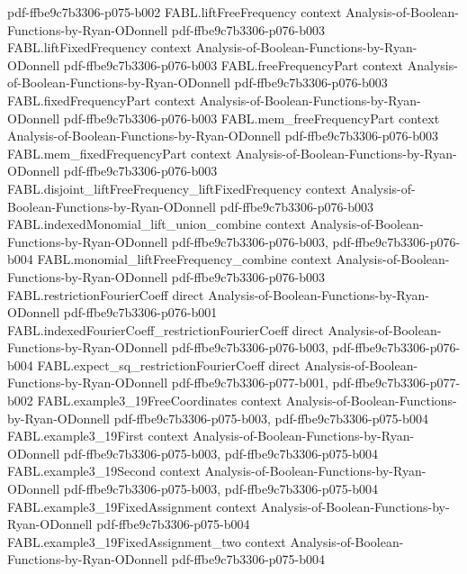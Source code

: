 \begin{theorem}
  {pdf-ffbe9c7b3306-p075-b002}
\proofstep
  {FABL.liftFreeFrequency}
  {context}
  {Analysis-of-Boolean-Functions-by-Ryan-ODonnell}
  {pdf-ffbe9c7b3306-p076-b003}
\proofstep
  {FABL.liftFixedFrequency}
  {context}
  {Analysis-of-Boolean-Functions-by-Ryan-ODonnell}
  {pdf-ffbe9c7b3306-p076-b003}
\proofstep
  {FABL.freeFrequencyPart}
  {context}
  {Analysis-of-Boolean-Functions-by-Ryan-ODonnell}
  {pdf-ffbe9c7b3306-p076-b003}
\proofstep
  {FABL.fixedFrequencyPart}
  {context}
  {Analysis-of-Boolean-Functions-by-Ryan-ODonnell}
  {pdf-ffbe9c7b3306-p076-b003}
\proofstep
  {FABL.mem_freeFrequencyPart}
  {context}
  {Analysis-of-Boolean-Functions-by-Ryan-ODonnell}
  {pdf-ffbe9c7b3306-p076-b003}
\proofstep
  {FABL.mem_fixedFrequencyPart}
  {context}
  {Analysis-of-Boolean-Functions-by-Ryan-ODonnell}
  {pdf-ffbe9c7b3306-p076-b003}
\proofstep
  {FABL.disjoint_liftFreeFrequency_liftFixedFrequency}
  {context}
  {Analysis-of-Boolean-Functions-by-Ryan-ODonnell}
  {pdf-ffbe9c7b3306-p076-b003}
\proofstep
  {FABL.indexedMonomial_lift_union_combine}
  {context}
  {Analysis-of-Boolean-Functions-by-Ryan-ODonnell}
  {pdf-ffbe9c7b3306-p076-b003,
    pdf-ffbe9c7b3306-p076-b004}
\proofstep
  {FABL.monomial_liftFreeFrequency_combine}
  {context}
  {Analysis-of-Boolean-Functions-by-Ryan-ODonnell}
  {pdf-ffbe9c7b3306-p076-b003}
\proofstep
  {FABL.restrictionFourierCoeff}
  {direct}
  {Analysis-of-Boolean-Functions-by-Ryan-ODonnell}
  {pdf-ffbe9c7b3306-p076-b001}
\proofstep
  {FABL.indexedFourierCoeff_restrictionFourierCoeff}
  {direct}
  {Analysis-of-Boolean-Functions-by-Ryan-ODonnell}
  {pdf-ffbe9c7b3306-p076-b003,
    pdf-ffbe9c7b3306-p076-b004}
\proofstep
  {FABL.expect_sq_restrictionFourierCoeff}
  {direct}
  {Analysis-of-Boolean-Functions-by-Ryan-ODonnell}
  {pdf-ffbe9c7b3306-p077-b001,
    pdf-ffbe9c7b3306-p077-b002}
\proofstep
  {FABL.example3_19FreeCoordinates}
  {context}
  {Analysis-of-Boolean-Functions-by-Ryan-ODonnell}
  {pdf-ffbe9c7b3306-p075-b003,
    pdf-ffbe9c7b3306-p075-b004}
\proofstep
  {FABL.example3_19First}
  {context}
  {Analysis-of-Boolean-Functions-by-Ryan-ODonnell}
  {pdf-ffbe9c7b3306-p075-b003,
    pdf-ffbe9c7b3306-p075-b004}
\proofstep
  {FABL.example3_19Second}
  {context}
  {Analysis-of-Boolean-Functions-by-Ryan-ODonnell}
  {pdf-ffbe9c7b3306-p075-b003,
    pdf-ffbe9c7b3306-p075-b004}
\proofstep
  {FABL.example3_19FixedAssignment}
  {context}
  {Analysis-of-Boolean-Functions-by-Ryan-ODonnell}
  {pdf-ffbe9c7b3306-p075-b004}
\proofstep
  {FABL.example3_19FixedAssignment_two}
  {context}
  {Analysis-of-Boolean-Functions-by-Ryan-ODonnell}
  {pdf-ffbe9c7b3306-p075-b004}

\end{theorem}
